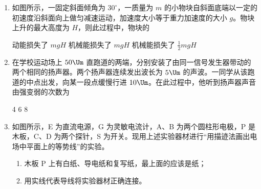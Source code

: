 \documentclass[\gkver]{gaokaozhenti}
\begin{document}
\begin{enumerate}

\item
如图所示，一固定斜面倾角为 $30^\circ$，一质量为 $m$ 的小物块自斜面底端以一定的初速度沿斜面向上做匀减速运动，加速度大小等于重力加速度的大小 $g$。物块上升的最大高度为 $H$，则此过程中，物块的


{动能损失了 $mgH$}
{机械能损失了 $mgH$}
{机械能损失了 $\frac{1}{2}mgH$}


\item
在学校运动场上 $50\Um$ 直跑道的两端，分别安装了由同一信号发生器带动的两个相同的扬声器。两个扬声器连续发出波长为 $5\Um$ 的声波。一同学从该跑道的中点出发，向某一段点缓慢行进 $10\Um$。在此过程中，他听到扬声器声音由强变弱的次数为

{4}
{6}
{8}


\item
如图所示，E 为直流电源，G 为灵敏电流计，A、B 为两个圆柱形电极，P 是木板，C、D 为两个探针，S 为开关。现用上述实验器材进行“用描迹法画出电场中平面上的等势线”的实验。

\begin{enumerate}
	\item
	木板 P 上有白纸、导电纸和复写纸，最上面的应该是纸；
	\item
	用实线代表导线将实验器材正确连接。
\end{enumerate}

\end{enumerate}
\end{document}
